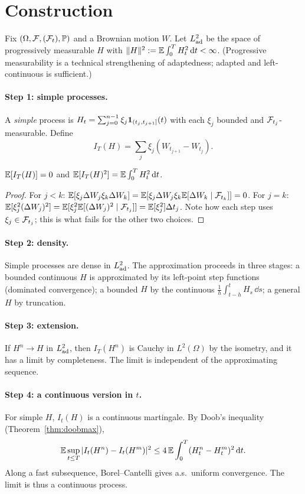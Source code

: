 \section{Construction}

Fix $(\Omega,\mathcal{F},(\mathcal{F}_t),\mathbb{P})$ and a Brownian motion $W$. Let $L^2_{\rm ad}$ be the space of progressively measurable $H$ with $\|H\|^2:=\mathbb{E}\int_0^TH_t^2\,\mathrm{d} t<\infty$. (Progressive measurability is a technical strengthening of adaptedness; adapted and left-continuous is sufficient.)

\paragraph{Step 1: simple processes.} A \emph{simple} process is $H_t=\sum_{j=0}^{n-1}\xi_j\mathbf{1}_{(t_j,t_{j+1}]}(t)$ with each $\xi_j$ bounded and $\mathcal{F}_{t_j}$-measurable. Define
\[
I_T(H)=\sum_j\xi_j(W_{t_{j+1}}-W_{t_j}).
\]

\begin{lemma}\label{lem:iso}
$\mathbb{E}[I_T(H)]=0$ and $\mathbb{E}[I_T(H)^2]=\mathbb{E}\int_0^TH_t^2\,\mathrm{d} t$.
\end{lemma}
\begin{proof}
For $j<k$: $\mathbb{E}[\xi_j\Delta W_j\xi_k\Delta W_k]=\mathbb{E}[\xi_j\Delta W_j\xi_k\mathbb{E}[\Delta W_k\mid\mathcal{F}_{t_k}]]=0$. For $j=k$: $\mathbb{E}[\xi_j^2(\Delta W_j)^2]=\mathbb{E}[\xi_j^2\mathbb{E}[(\Delta W_j)^2\mid\mathcal{F}_{t_j}]]=\mathbb{E}[\xi_j^2]\Delta t_j$. Note how each step uses $\xi_j\in\mathcal{F}_{t_j}$; this is what fails for the other two choices.
\end{proof}

\paragraph{Step 2: density.} Simple processes are dense in $L^2_{\rm ad}$. The approximation proceeds in three stages: a bounded continuous $H$ is approximated by its left-point step functions (dominated convergence); a bounded $H$ by the continuous $\tfrac1h\int_{t-h}^tH_s\,\dd s$; a general $H$ by truncation.

\paragraph{Step 3: extension.} If $H^n\to H$ in $L^2_{\rm ad}$, then $I_T(H^n)$ is Cauchy in $L^2(\Omega)$ by the isometry, and it has a limit by completeness. The limit is independent of the approximating sequence.

\paragraph{Step 4: a continuous version in $t$.} For simple $H$, $I_t(H)$ is a continuous martingale. By Doob's inequality (Theorem~\ref{thm:doobmax}),
\[
\mathbb{E}\sup_{t\le T}|I_t(H^n)-I_t(H^m)|^2\le4\,\mathbb{E}\int_0^T(H^n_t-H^m_t)^2\,\mathrm{d} t.
\]
Along a fast subsequence, Borel--Cantelli gives a.s.\ uniform convergence. The limit is thus a continuous process.

